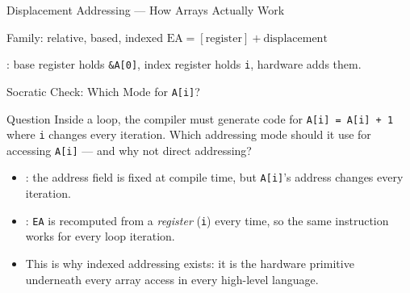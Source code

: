 \documentclass[aspectratio=169]{beamer}
\begin{document}
\begin{frame}{Displacement Addressing --- How Arrays Actually Work}
  \begin{block}{Family: relative, based, indexed}
    $\text{EA} = [\text{register}] + \text{displacement}$
  \end{block}
  \begin{center}
  \end{center}
  : base register holds
  \texttt{\&A[0]}, index register holds \texttt{i}, hardware adds them.
\end{frame}

\begin{frame}{Socratic Check: Which Mode for \texttt{A[i]}?}
  \begin{alertblock}{Question}
    Inside a loop, the compiler must generate code for \texttt{A[i] = A[i] + 1}
    where \texttt{i} changes every iteration. Which addressing mode should it use
    for accessing \texttt{A[i]} --- and why not direct addressing?
  \end{alertblock}
  \begin{itemize}
    \item {}: the address field is fixed at compile
      time, but \texttt{A[i]}'s address changes every iteration.
    \item {}: \texttt{EA} is recomputed from a
      \emph{register} (\texttt{i}) every time, so the same instruction works for
      every loop iteration.
    \item This is why indexed addressing exists: it is the hardware primitive
      underneath every array access in every high-level language.
  \end{itemize}
\end{frame}
\end{document}
